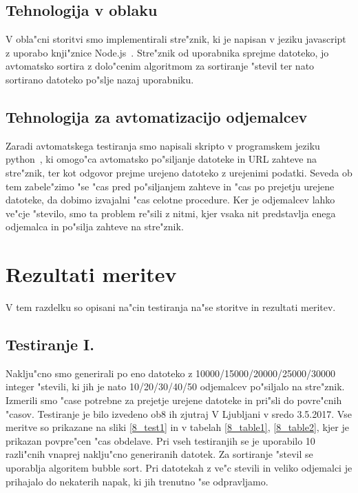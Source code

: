 \subsection{Tehnologija v oblaku}
V obla"cni storitvi smo implementirali stre"znik, ki je napisan v jeziku javascript z uporabo knji"znice Node.js~\cite{8_nodejs}. Stre"znik od uporabnika sprejme datoteko, jo avtomatsko sortira z dolo"cenim algoritmom za sortiranje "stevil ter nato sortirano datoteko po"slje nazaj uporabniku. 

\subsection{Tehnologija za avtomatizacijo odjemalcev}
Zaradi avtomatskega testiranja smo napisali skripto v programskem jeziku python~\cite{8_python}, ki omogo"ca avtomatsko po"siljanje datoteke in URL zahteve na stre"znik, ter kot odgovor prejme urejeno datoteko z urejenimi podatki. Seveda ob tem zabele"zimo "se "cas pred po"siljanjem zahteve in "cas po prejetju urejene datoteke, da dobimo izvajalni "cas celotne procedure. Ker je odjemalcev lahko ve"cje "stevilo, smo ta problem re"sili z nitmi, kjer vsaka nit predstavlja enega odjemalca in po"silja zahteve na stre"znik.

\section{Rezultati meritev}
V tem razdelku so opisani na"cin testiranja na"se  storitve in rezultati meritev.

\subsection{Testiranje I.}
Naklju"cno smo generirali po eno datoteko z 10000/15000/20000/25000/30000 integer "stevili, ki jih je nato 10/20/30/40/50 odjemalcev po"siljalo na stre"znik. Izmerili smo "case potrebne za prejetje urejene datoteke in pri"sli do povre"cnih "casov. Testiranje je bilo izvedeno ob8 ih zjutraj V Ljubljani v sredo 3.5.2017. Vse meritve so prikazane na sliki \ref{8_test1} in v tabelah \ref{8_table1}, \ref{8_table2}, kjer je prikazan povpre"cen "cas obdelave. Pri vseh testiranjih se je uporabilo 10 razli"cnih vnaprej naklju"cno generiranih datotek. Za sortiranje "stevil se uporablja algoritem bubble sort. 
 Pri datotekah z ve"c stevili in veliko odjemalci je prihajalo do nekaterih napak, ki jih trenutno "se odpravljamo.\\\\

